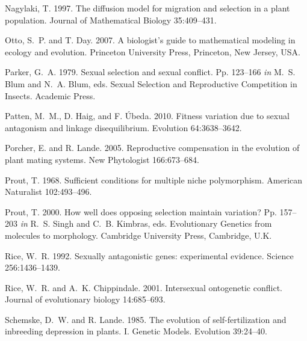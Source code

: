 \documentclass{article}
\begin{document}
\begin{thebibliography}{}
Nagylaki, T. 1997.
\newblock The diffusion model for migration and selection in a plant population.
\newblock Journal of Mathematical Biology 35:409--431.

Otto, S.~P. and T. Day. 2007.
\newblock A biologist's guide to mathematical modeling in ecology and evolution.
\newblock Princeton University Press, Princeton, New Jersey, USA.

Parker, G.~A. 1979.
\newblock Sexual selection and sexual conflict.
\newblock Pp. 123--166 \textit{in} M.~S. Blum and N.~A. Blum, eds. Sexual Selection and Reproductive Competition in Insects. Academic Press.

Patten, M.~M., D. Haig, and F. \'{U}beda. 2010.
\newblock Fitness variation due to sexual antagonism and linkage disequilibrium.
\newblock Evolution 64:3638--3642.

Porcher, E. and R. Lande. 2005.
\newblock Reproductive compensation in the evolution of plant mating systems.
\newblock New Phytologist 166:673--684.

Prout, T. 1968.
\newblock Sufficient conditions for multiple niche polymorphism.
\newblock American Naturalist 102:493--496.

Prout, T. 2000.
\newblock How well does opposing selection maintain variation?
\newblock Pp. 157--203 \textit{in} R.~S. Singh and C.~B. Kimbras, eds. Evolutionary Genetics from molecules to morphology. Cambridge University Press, Cambridge, U.K.

Rice, W.~R. 1992.
\newblock Sexually antagonistic genes: experimental evidence.
\newblock Science 256:1436--1439.

Rice, W.~R. and A.~K. Chippindale. 2001.
\newblock Intersexual ontogenetic conflict.
\newblock Journal of evolutionary biology 14:685--693.

Schemske, D.~W. and R. Lande. 1985.
\newblock The evolution of self-fertilization and inbreeding depression in plants. I. Genetic Models.
\newblock Evolution 39:24--40.


\end{thebibliography}
\end{document}
